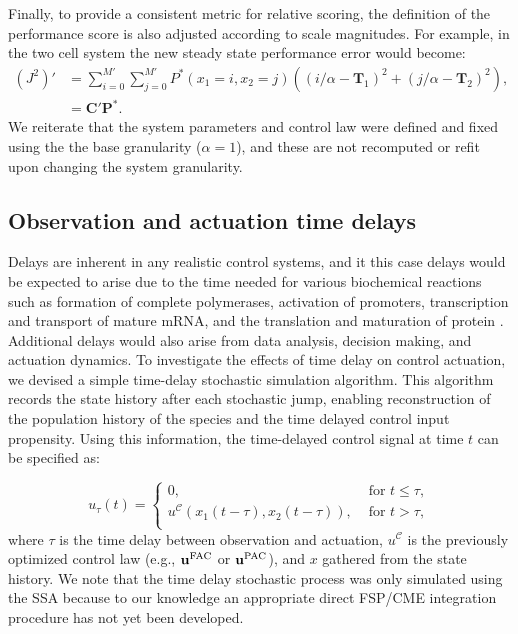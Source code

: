 \documentclass[12pt]{iopart}
\begin{document}
Finally, to provide a consistent metric for relative scoring, the definition of the performance score is also adjusted according to scale magnitudes. For example, in the two cell system the new steady state performance error would become:
\begin{eqnarray}
(J^2)' &= \sum_{i=0}^{M'}  \sum_{j=0}^{M'}P^*(x_1=i,x_2=j) ((i/\alpha - \mathbf T_1)^2 + (j/\alpha -\mathbf T_2)^2),\nonumber \\
& =\mathbf{C}'\mathbf{P}^*.
\label{EuclidV}
\end{eqnarray}
We reiterate that the system parameters and control law were defined and fixed using the the base granularity ($\alpha=1$), and these are not recomputed or refit upon changing the system granularity.

\subsection{Observation and actuation time delays}\label{sec:Delay}

Delays are inherent in any realistic control systems, and it this case delays would be expected to arise due to the time needed for various biochemical reactions such as formation of complete polymerases, activation of promoters, transcription and transport of mature mRNA, and the translation and maturation of protein \cite{Cai2007}. 
Additional delays would also arise from data analysis, decision making, and actuation dynamics. 
To investigate the effects of time delay on control actuation, we devised a simple time-delay stochastic simulation algorithm. 
This algorithm records the state history after each stochastic jump, enabling reconstruction of the population history of the species and the time delayed control input propensity.  
Using this information, the time-delayed control signal at time $t$ can be specified as: 

\begin{equation}
u_{\tau}(t)=\left\{
\begin{array}{rl}
      0 ,&\textrm{ for }  t \leq \tau, \\
      {u}^{\mathcal{C}}(x_1(t-\tau), x_2(t-\tau)) , &\textrm{ for }   t > \tau,\\
\end{array}\right. 
\label{timeDelaySSA}
\end{equation}
where $\tau$ is the time delay between observation and actuation, ${u}^{\mathcal{C}}$ is the previously optimized control law (e.g., $\mathbf{u}^{\rm FAC}$ or $\mathbf{u}^{\rm PAC}$), and $x$ gathered from the state history. 
We note that the time delay stochastic process was only simulated using the SSA because to our knowledge an appropriate direct FSP/CME integration procedure has not yet been developed.
\end{document}
